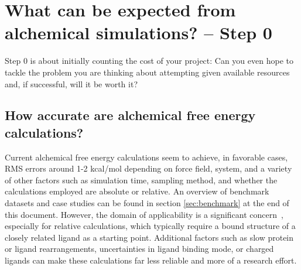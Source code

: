 \documentclass[9pt,bestpractices]{livecoms}
\begin{document}
\section{What can be expected from alchemical simulations? -- Step 0}
\label{sec:step0}



Step 0 is about initially counting the cost of your
project: Can you even hope to tackle the problem you are thinking
about attempting given available resources and, if successful, will it
be worth it?
\subsection*{How accurate are alchemical free energy calculations?}

Current alchemical free energy calculations seem to achieve, in favorable cases, RMS errors around 1-2 kcal/mol depending on force field, system, and a variety of other factors such as simulation time, sampling method, and whether the calculations employed are absolute or relative. An overview of benchmark datasets and case studies can be found in section \ref{sec:benchmark} at the end of this document.
However, the domain of applicability is a significant concern~\cite{Sherborne2016, Cournia2017}, especially for relative calculations, which typically require a bound structure of a closely
related ligand as a starting point. Additional factors such as slow protein or ligand rearrangements, uncertainties in ligand binding mode, or charged ligands can make these calculations far less reliable and more of a research effort.
\end{document}
